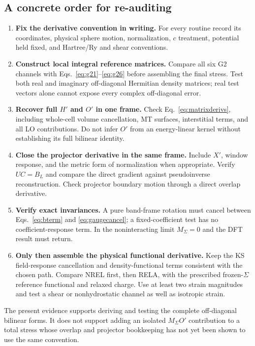 \documentclass[11pt]{article}
\newcommand{\note}[2]{\par\medskip\noindent\colorbox{#1}{\parbox{\dimexpr\linewidth-2\fboxsep\relax}{#2}}\par\medskip}
\newcommand{\key}[1]{\note{pale}{#1}}
\begin{document}
\subsection{A concrete order for re-auditing}
\begin{enumerate}[itemsep=5pt]
\item \textbf{Fix the derivative convention in writing.} For every
 routine record its coordinates, physical sphere motion, normalization,
 $c$ treatment, potential held fixed, and Hartree/Ry and shear conventions.
\item \textbf{Construct local integral reference matrices.} Compare all
 six G2 channels with Eqs.~\eqref{eq:g21}--\eqref{eq:g26} before
 assembling the final stress. Test both real and imaginary off-diagonal
 Hermitian density matrices; real test vectors alone cannot expose every
 complex off-diagonal error.
\item \textbf{Recover full $H'$ and $O'$ in one frame.} Check
 Eq.~\eqref{eq:matrixderivs}, including whole-cell volume cancellation,
 MT surfaces, interstitial terms, and all LO contributions. Do not infer
 $O'$ from an energy-linear kernel without establishing its full
 bilinear identity.
\item \textbf{Close the projector derivative in the same frame.}
 Include $X'$, window response, and the metric form of normalization
 when appropriate. Verify $UC=B_L$ and compare the direct gradient
 against pseudoinverse reconstruction. Check projector boundary motion
 through a direct overlap derivative.
\item \textbf{Verify exact invariances.} A pure band-frame rotation must
 cancel between Eqs.~\eqref{eq:bterm} and \eqref{eq:gaugecancel}; a
 fixed-coefficient test has no coefficient-response term. In the
 noninteracting limit $M_\Sigma=0$ and the DFT result must return.
\item \textbf{Only then assemble the physical functional derivative.}
 Keep the KS field-response cancellation and density-functional terms
 consistent with the chosen path. Compare NREL first, then RELA, with
 the prescribed frozen-$\Sigma$ reference functional and relaxed charge.
 Use at least two strain magnitudes and test a shear or nonhydrostatic
 channel as well as isotropic strain.
\end{enumerate}

\key{The present evidence supports deriving and testing the complete
off-diagonal bilinear forms. It does not support adding an isolated
$M_\Sigma O'$ contribution to a total stress whose overlap and projector
bookkeeping has not yet been shown to use the same convention.}
\end{document}
